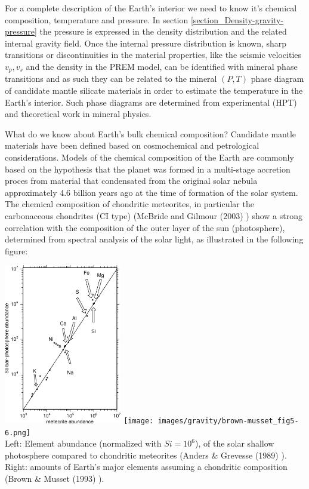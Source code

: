 For a complete description of the Earth's interior we need to know
it's chemical composition, temperature and pressure.
In section \ref{section_Density-gravity-pressure} 
the pressure is expressed in the density distribution 
and the related internal gravity field.
Once the internal pressure distribution is known,
sharp transitions or discontinuities in the material properties,
like the seismic velocities $v_p, v_s$ and the density 
in the PREM model,
can be identified with mineral phase transitions and as such they can
be related to the mineral $(P,T)$ phase diagram
of candidate mantle silicate materials in order to estimate the temperature 
in the Earth's interior.
Such phase diagrams are determined from
experimental (HPT) and theoretical work in mineral physics.

What do we know about Earth's bulk chemical composition?
Candidate mantle materials have been defined based on
cosmochemical and petrological considerations.
Models of the chemical composition of the Earth are commonly based on
the hypothesis that the planet was formed in a multi-stage accretion proces
from material that condensated from the original solar nebula
approximately 4.6 billion years ago at the time of formation of the
solar system.
The chemical composition of chondritic meteorites, in particular
the carbonaceous chondrites (CI type)
(McBride and Gilmour (2003) \cite{mcgi03})
show a strong correlation with the composition of the outer layer of
the sun (photosphere), determined from spectral analysis of the 
solar light, as illustrated in the following figure:

\begin{center}
\includegraphics[height=7cm]{images/gravity/photosphere-meteoritic-restricted.png}
\texttt{[image: images/gravity/brown-musset\_fig5-6.png]} \\
{\captionfont
Left:
Element abundance (normalized with $Si=10^6$),
of the solar shallow photosphere compared to
chondritic meteorites (Anders \& Grevesse (1989) \cite{angr89}).
Right:
amounts of Earth's major elements assuming a chondritic
composition (Brown \& Musset (1993) \cite{brmu93}). 
}
\end{center}


